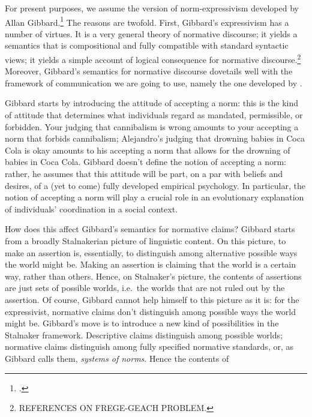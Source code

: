 \documentclass[11pt,article,oneside]{memoir}
\begin{document}
For present purposes, we assume the version of norm-expressivism developed by Allan Gibbard.\footcite{gibbard1990} The reasons are twofold. First, Gibbard's expressivism has a number of virtues. It is a very general theory of normative discourse; it yields a semantics that is compositional and fully compatible with standard syntactic views; it yields a simple account of logical consequence for normative discourse.\footnote{REFERENCES ON FREGE-GEACH PROBLEM.} Moreover, Gibbard's semantics for normative discourse dovetails well with the framework of communication we are going to use, namely the one developed by \citet{stalnaker1978}. 

Gibbard starts by introducing the attitude of accepting a norm: this is the kind of attitude that determines what individuals regard as mandated, permissible, or forbidden. Your judging that cannibalism is wrong amounts to your accepting a norm that forbids cannibalism; Alejandro's judging that drowning babies in Coca Cola is okay amounts to his accepting a norm that allows for the drowning of babies in Coca Cola. Gibbard doesn't define the notion of accepting a norm: rather, he assumes that this attitude will be part, on a par with beliefs and desires, of a (yet to come) fully developed empirical psychology. In particular, the notion of accepting a norm will play a crucial role in an evolutionary explanation of individuals' coordination in a social context.

How does this affect Gibbard's semantics for normative claims? Gibbard starts from a broadly Stalnakerian picture of linguistic content. On this picture, to make an assertion is, essentially, to distinguish among alternative possible ways the world might be. Making an assertion is claiming that the world is a certain way, rather than others. Hence, on Stalnaker's picture, the contents of assertions are just sets of possible worlds, i.e.~the worlds that are not ruled out by the assertion. Of course, Gibbard cannot help himself to this picture as it is: for the expressivist, normative claims don't distinguish among possible ways the world might be. Gibbard's move is to introduce a new kind of possibilities in the Stalnaker framework. Descriptive claims distinguish among possible worlds; normative claims distinguish among fully specified normative standards, or, as Gibbard calls them, \emph{systems of norms}. Hence the contents of 
\end{document}
